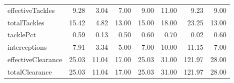\begin{table}[H]
\begin{tabular}{lrrrrrrr}
effectiveTackles & 9.28 & 3.04 & 7.00 & 9.00 & 11.00 & 9.23 & 9.00 \\
totalTackles & 15.42 & 4.82 & 13.00 & 15.00 & 18.00 & 23.25 & 13.00 \\
tacklePct & 0.59 & 0.13 & 0.50 & 0.60 & 0.70 & 0.02 & 0.60 \\
interceptions & 7.91 & 3.34 & 5.00 & 7.00 & 10.00 & 11.15 & 7.00 \\
effectiveClearance & 25.03 & 11.04 & 17.00 & 25.03 & 31.00 & 121.97 & 28.00 \\
totalClearance & 25.03 & 11.04 & 17.00 & 25.03 & 31.00 & 121.97 & 28.00 \\
\hline
\end{tabular}
\end{table}

